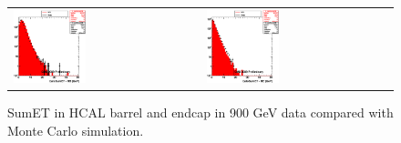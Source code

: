 \begin{figure}[h!]
 \centering
 \begin{tabular}{ll}
  \includegraphics[width=0.40\textwidth]{plots_DataVsMC_MB_900GeV/h_caloSumetHB.eps} &
  \includegraphics[width=0.40\textwidth]{plots_DataVsMC_MB_900GeV/h_caloSumetHE.eps} \\
 \end{tabular}
 \caption{SumET in HCAL barrel and endcap in 900 GeV data compared
   with Monte Carlo simulation.
          \label{fig:DataVsMC_MB_900_5}}
\end{figure}

